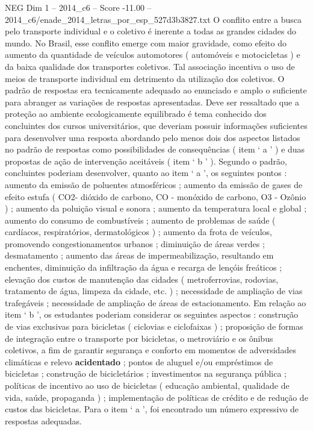 \begin{textsample}{NEG Dim 1 – 2014\_c6 – Score -11.00 – 2014\_c6/enade\_2014\_letras\_por\_esp\_527d3b3827.txt}
O conflito entre a busca pelo transporte individual e o coletivo é inerente a todas as grandes cidades do mundo.
No Brasil, esse conflito emerge com maior gravidade, como efeito do aumento da quantidade de veículos automotores ( automóveis e motocicletas ) e da baixa qualidade dos transportes coletivos.
Tal associação incentiva o uso de meios de transporte individual em detrimento da utilização dos coletivos.
O padrão de respostas era tecnicamente adequado ao enunciado e amplo o suficiente para abranger as variações de respostas apresentadas.
Deve ser ressaltado que a proteção ao ambiente ecologicamente equilibrado é tema conhecido dos concluintes dos cursos universitários, que deveriam possuir informações suficientes para desenvolver uma resposta abordando pelo menos dois dos aspectos listados no padrão de respostas como possibilidades de consequências ( item ‘ a ’ ) e duas propostas de ação de intervenção aceitáveis ( item ‘ b ’ ).
Segundo o padrão, concluintes poderiam desenvolver, quanto ao item ‘ a ’, os seguintes pontos : aumento da emissão de poluentes atmosféricos ; aumento da emissão de gases de efeito estufa ( CO2- dióxido de carbono, CO - monóxido de carbono, O3 - Ozônio ) ; aumento da poluição visual e sonora ; aumento da temperatura local e global ; aumento do consumo de combustíveis ; aumento de problemas de saúde ( cardíacos, respiratórios, dermatológicos ) ; aumento da frota de veículos, promovendo congestionamentos urbanos ; diminuição de áreas verdes ; desmatamento ; aumento das áreas de impermeabilização, resultando em enchentes, diminuição da infiltração da água e recarga de lençóis freáticos ; elevação dos custos de manutenção das cidades ( metroferrovias, rodovias, tratamento de água, limpeza da cidade, etc. ) ; necessidade de ampliação de vias trafegáveis ; necessidade de ampliação de áreas de estacionamento.
Em relação ao item ‘ b ’, os estudantes poderiam considerar os seguintes aspectos : construção de vias exclusivas para bicicletas ( ciclovias e ciclofaixas ) ; proposição de formas de integração entre o transporte por bicicletas, o metroviário e os ônibus coletivos, a fim de garantir segurança e conforto em momentos de adversidades climáticas e relevo \textbf{acidentado} ; pontos de aluguel e/ou empréstimos de bicicletas ; construção de bicicletários ; investimentos na segurança pública ; políticas de incentivo ao uso de bicicletas ( educação ambiental, qualidade de vida, saúde, propaganda ) ; implementação de políticas de crédito e de redução de custos das bicicletas.
Para o item ‘ a ’, foi encontrado um número expressivo de respostas adequadas.

\end{textsample}
